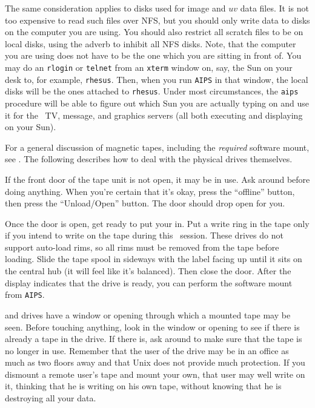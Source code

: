      The same consideration applies to disks used for image and $uv$
data files.  It is not too expensive to read such files over NFS, but
you should only write data to disks on the computer you are using.
You should also restrict all scratch files to be on local disks, using
the adverb {\tt {}} to inhibit all NFS disks.  Note, that
the computer you are using does not have to be the one which you are
sitting in front of.  You may do an {\tt rlogin} or {\tt telnet} from
an {\tt xterm} window on, say, the Sun on your desk to, for example,
{\tt rhesus}.  Then, when you run {\tt AIPS} in that window, the local
disks will be the ones attached to {\tt rhesus}.  Under most
circumstances, the {\tt aips} procedure will be able to figure out
which Sun you are actually typing on and use it for the \AIPS\ TV,
message, and graphics servers (all both executing and displaying on
your Sun).


    For a general discussion of magnetic tapes, including the {\it
required\/} software mount, see .  The following describes how
to deal with the physical  drives themselves.


    If the front door of the tape unit is not open, it may be in use.
Ask around before doing anything.  When you're certain that it's okay,
press the ``offline'' button, then press the ``Unload/Open'' button.
The door should drop open for you.

    Once the door is open, get ready to put your 
in.  Put a write ring in the tape only if you intend to write on the
tape during this \AIPS\ session.  These drives do not support
auto-load rims, so all rims must be removed from the tape before
loading.  Slide the tape spool in sideways with the label facing up
until it sits on the central hub (it will feel like it's balanced).
Then close the door.  After the display indicates that the drive is
ready, you can perform the software mount from \hbox{{\tt AIPS}}.


      and  drives have a window or
opening through which a mounted tape may be seen.  Before touching
anything, look in the window or opening to see if there is already a
tape in the drive.  If there is, ask around to make sure that the tape
is no longer in use.  Remember that the user of the drive may be in an
office as much as two floors away and that Unix does not provide much
protection.  If you dismount a remote user's tape and mount your own,
that user may well write on it, thinking that he is writing on his own
tape, without knowing that he is destroying all your data.

